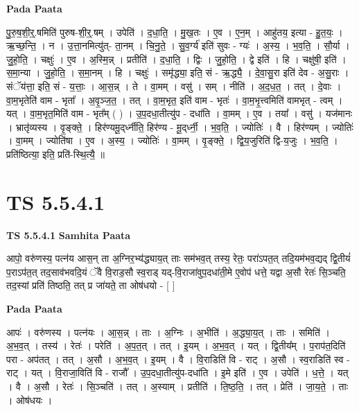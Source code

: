 \documentclass[17pt]{extarticle}
\begin{document}
\textbf{Pada Paata} \newline

पु॒रु॒ष॒शी॒र्॒.षमिति॑ पुरुष-शी॒र्॒.षम् । उपेति॑ । द॒धा॒ति॒ । मु॒ख॒तः । ए॒व । ए॒न॒म् । आहु॑तय॒ इत्या - हु॒त॒यः॒ । ऋ॒च्छ॒न्ति॒ । न । उ॒त्ता॒नमित्यु॑त्- ता॒नम् । चि॒नु॒ते॒ । सु॒व॒र्ग्य॑ इति॑ सुवः - ग्यः॑ । अ॒स्य॒ । भ॒व॒ति॒ । सौ॒र्या । जु॒हो॒ति॒ । चक्षुः॑ । ए॒व । अ॒स्मि॒न्न् । प्रतीति॑ । द॒धा॒ति॒ । द्विः । जु॒हो॒ति॒ । द्वे इति॑ । हि । चक्षु॑षी॒ इति॑ । स॒मा॒न्या । जु॒हो॒ति॒ । स॒मा॒नम् । हि । चक्षुः॑ । समृ॑द्ध्या॒ इति॒ सं - ऋ॒द्ध्यै॒ । दे॒वा॒सु॒रा इति॑ देव - अ॒सु॒राः । संॅय॑त्ता॒ इति॒ सं - य॒त्ताः॒ । आ॒स॒न्न् । ते । वा॒मम् । वसु॑ । सम् । नीति॑ । अ॒द॒ध॒त॒ । तत् । दे॒वाः । वा॒म॒भृतेति॑ वाम - भृता᳚ । अ॒वृ॒ञ्ज॒त॒ । तत् । वा॒म॒भृत॒ इति॑ वाम - भृतः॑ । वा॒म॒भृ॒त्त्वमिति॑ वामभृत् - त्वम् । यत् । वा॒म॒भृत॒मिति॑ वाम - भृत᳚म् ( ) । उ॒प॒दधा॒तीत्यु॑प - दधा॑ति । वा॒मम् । ए॒व । तया᳚ । वसु॑ । यज॑मानः । भ्रातृ॑व्यस्य । वृ॒ङ्क्ते॒ । हिर॑ण्यमू॒द्‌र्ध्नीति॒ हिर॑ण्य - मू॒द्‌र्ध्नी॒ । भ॒व॒ति॒ । ज्योतिः॑ । वै । हिर॑ण्यम् । ज्योतिः॑ । वा॒मम् । ज्योति॑षा । ए॒व । अ॒स्य॒ । ज्योतिः॑ । वा॒मम् । वृ॒ङ्क्ते॒ । द्वि॒य॒जुरिति॑ द्वि-य॒जुः । भ॒व॒ति॒ । प्रति॑ष्ठित्या॒ इति॒ प्रति॑-स्थि॒त्यै॒ ॥  \newline





\section{ TS 5.5.4.1 }

\textbf{TS 5.5.4.1 } \newline
\textbf{Samhita Paata} \newline

आपो॒ वरु॑णस्य॒ पत्न॑य आस॒न् ता अ॒ग्निर॒भ्य॑द्ध्याय॒त् ताः सम॑भव॒त् तस्य॒ रेतः॒ परा॑ऽपत॒त् तदि॒यम॑भव॒द्यद् द्वि॒तीयं॑ प॒राऽप॑त॒त् तद॒साव॑भवदि॒यं ॅवै वि॒राड॒सौ स्व॒राड् यद्-वि॒राजा॑वुप॒दधा॑ती॒मे ए॒वोप॑ धत्ते॒ यद्वा अ॒सौ रेतः॑ सि॒ञ्चति॒ तद॒स्यां प्रति॑ तिष्ठति॒ तत् प्र जा॑यते॒ ता ओष॑धयो - [  ] \newline

\textbf{Pada Paata} \newline

आपः॑ । वरु॑णस्य । पत्न॑यः । आ॒स॒न्न् । ताः । अ॒ग्निः । अ॒भीति॑ । अ॒द्ध्या॒य॒त् । ताः । समिति॑ । अ॒भ॒व॒त् । तस्य॑ । रेतः॑ । परेति॑ । अ॒प॒त॒त् । तत् । इ॒यम् । अ॒भ॒व॒त् । यत् । द्वि॒तीय᳚म् । प॒राप॑त॒दिति॑ परा - अप॑तत् । तत् । अ॒सौ । अ॒भ॒व॒त् । इ॒यम् । वै । वि॒राडिति॑ वि - राट् । अ॒सौ । स्व॒राडिति॑ स्व - राट् । यत् । वि॒राजा॒विति॑ वि - राजौ᳚ । उ॒प॒दधा॒तीत्यु॑प-दधा॑ति । इ॒मे इति॑ । ए॒व । उपेति॑ । ध॒त्ते॒ । यत् । वै । अ॒सौ । रेतः॑ । सि॒ञ्चति॑ । तत् । अ॒स्याम् । प्रतीति॑ । ति॒ष्ठ॒ति॒ । तत् । प्रेति॑ । जा॒य॒ते॒ । ताः । ओष॑धयः ।  \newline
\end{document}
